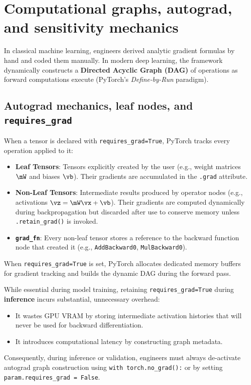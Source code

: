 \documentclass[../labs.tex]{subfiles}
\begin{document}
\section{Computational graphs, autograd, and sensitivity mechanics}

In classical machine learning, engineers derived analytic gradient formulas by hand and coded them manually. In modern deep learning, the framework dynamically constructs a \textbf{Directed Acyclic Graph (DAG)} of operations as forward computations execute (PyTorch's \emph{Define-by-Run} paradigm).

\subsection{Autograd mechanics, leaf nodes, and \texttt{requires\_grad}}
When a tensor is declared with \texttt{requires\_grad=True}, PyTorch tracks every operation applied to it:
\begin{itemize}
    \item \textbf{Leaf Tensors}: Tensors explicitly created by the user (e.g., weight matrices $\mW$ and biases $\vb$). Their gradients are accumulated in the \texttt{.grad} attribute.
    \item \textbf{Non-Leaf Tensors}: Intermediate results produced by operator nodes (e.g., activations $\vz = \mW \vx + \vb$). Their gradients are computed dynamically during backpropagation but discarded after use to conserve memory unless \texttt{.retain\_grad()} is invoked.
    \item \textbf{\texttt{grad\_fn}}: Every non-leaf tensor stores a reference to the backward function node that created it (e.g., \texttt{AddBackward0}, \texttt{MulBackward0}).
\end{itemize}

\begin{examinsight}
When \texttt{requires\_grad=True} is set, PyTorch allocates dedicated memory buffers for gradient tracking and builds the dynamic DAG during the forward pass. 

While essential during model training, retaining \texttt{requires\_grad=True} during \textbf{inference} incurs substantial, unnecessary overhead:
\begin{itemize}
    \item It wastes GPU VRAM by storing intermediate activation histories that will never be used for backward differentiation.
    \item It introduces computational latency by constructing graph metadata.
\end{itemize}
Consequently, during inference or validation, engineers must always de-activate autograd graph construction using \texttt{with torch.no\_grad():} or by setting \texttt{param.requires\_grad = False}.
\end{examinsight}
\end{document}
